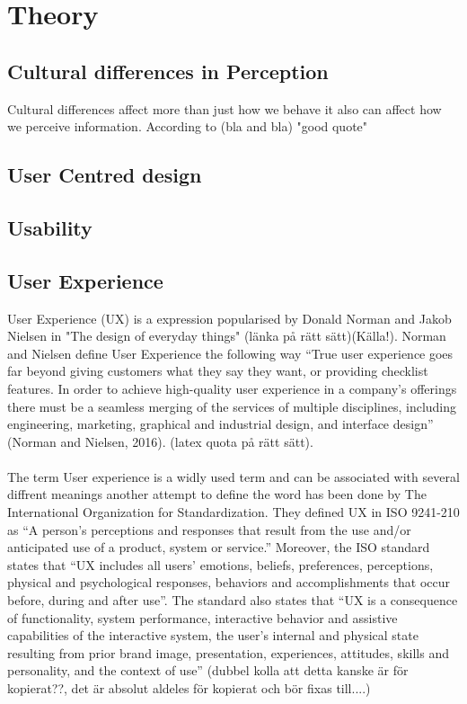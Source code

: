 
\chapter{Theory} %

\label{Theory} %




\section{Cultural differences in Perception}
Cultural differences affect more than just how we behave it also can affect how we perceive information. According to (bla and bla) "good quote" \cite{Holistic_vs_Analytic}
\section{User Centred design}
\section{Usability}
\section{User Experience}
User Experience (UX) is a expression popularised by Donald Norman and Jakob Nielsen in "The design of everyday things" (länka på rätt sätt)(Källa!). Norman and Nielsen define User Experience the following way “True user experience goes far beyond giving customers what they say they want, or providing checklist features. In order to achieve high-quality user experience in a company’s offerings there must be a seamless merging of the services of multiple disciplines, including engineering, marketing, graphical and industrial design, and interface design” (Norman and Nielsen, 2016). (latex quota på rätt sätt). 
\\\\
The term User experience is a widly used term and can be associated with several diffrent meanings another attempt to define the word has been done by The International Organization for Standardization. They defined UX in ISO 9241-210 as “A person's perceptions and responses that result from the use and/or anticipated use of a product, system or service.” Moreover, the ISO standard states that “UX includes all
users' emotions, beliefs, preferences, perceptions, physical and psychological
responses, behaviors and accomplishments that occur before, during and after use”. The standard also states that “UX is a consequence of
functionality, system performance, interactive behavior and assistive capabilities of the interactive system, the user's internal and physical state resulting from prior brand image, presentation,
experiences, attitudes, skills and personality, and the context of use” (dubbel kolla att detta kanske är för kopierat??, det är absolut aldeles för kopierat och bör fixas till....)


